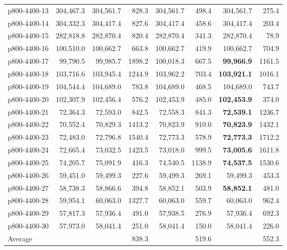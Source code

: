 \begin{table}[htbp]
\begin{tabular}{lrrrrrrr}
p800-4400-13 & 304{,}467.3 & 304{,}561.7 &   828.3 & 304{,}561.7 &   498.4 & 304{,}561.7 &   275.4 \\
p800-4400-14 & 304{,}332.3 & 304{,}417.4 &   827.6 & 304{,}417.4 &   458.6 & 304{,}417.4 &   203.4 \\
p800-4400-15 & 282{,}818.8 & 282{,}870.4 &   820.4 & 282{,}870.4 &   341.3 & 282{,}870.4 &    78.9 \\
\midrule
p800-4400-16 & 100{,}510.0 & 100{,}662.7 &   663.8 & 100{,}662.7 &   419.9 & 100{,}662.7 &   704.9 \\
p800-4400-17 &  99{,}790.5 &  99{,}985.7 & 1898.2 & 100{,}018.3 &   667.5 & \textbf{99{,}966.9} & 1161.5 \\
p800-4400-18 & 103{,}716.6 & 103{,}945.4 & 1244.9 & 103{,}962.2 &   703.4 & \textbf{103{,}921.1} & 1016.1 \\
p800-4400-19 & 104{,}544.4 & 104{,}689.0 &   783.8 & 104{,}689.0 &   468.5 & 104{,}689.0 &   743.7 \\
p800-4400-20 & 102{,}307.9 & 102{,}456.4 &   576.2 & 102{,}453.9 &   485.0 & \textbf{102{,}453.9} &   374.0 \\
p800-4400-21 &  72{,}364.3 &  72{,}593.0 &   842.5 &  72{,}558.3 &   841.3 & \textbf{72{,}539.1} & 1236.7 \\
p800-4400-22 &  70{,}552.4 &  70{,}829.3 & 1413.2 &  70{,}823.9 &   910.0 & \textbf{70{,}823.9} & 1432.1 \\
p800-4400-23 &  72{,}483.0 &  72{,}796.8 & 1540.4 &  72{,}773.3 &   578.9 & \textbf{72{,}773.3} & 1712.2 \\
p800-4400-24 &  72{,}665.4 &  73{,}032.5 & 1423.5 &  73{,}018.0 &   999.5 & \textbf{73{,}005.6} & 1611.8 \\
p800-4400-25 &  74{,}205.7 &  75{,}091.9 &   416.3 &  74{,}540.5 & 1138.9 & \textbf{74{,}537.5} & 1530.6 \\
p800-4400-26 &  59{,}451.0 &  59{,}499.3 &   227.6 &  59{,}499.3 &   269.1 &  59{,}499.3 &   453.3 \\
p800-4400-27 &  58{,}738.3 &  58{,}866.6 &   394.8 &  58{,}852.1 &   503.9 & \textbf{58{,}852.1} &   481.0 \\
p800-4400-28 &  59{,}954.1 &  60{,}063.0 & 1327.7 &  60{,}063.0 &   559.7 &  60{,}063.0 &   962.4 \\
p800-4400-29 &  57{,}817.3 &  57{,}936.4 &   491.0 &  57{,}938.5 &   276.9 &  57{,}936.4 &   692.3 \\
p800-4400-30 &  57{,}973.0 &  58{,}041.4 &   251.0 &  58{,}041.4 &   150.0 &  58{,}041.4 &   226.0 \\
\midrule
Average       &             &             &   838.3 &             &   519.6 &             &   552.3 \\
\bottomrule
\end{tabular}
\end{table}
